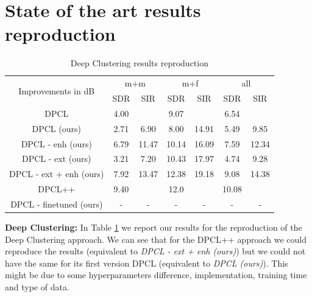 \documentclass[master, tikz, final,11pt, dvipdfmx]{iscs-thesis}
\begin{document}
\section{State of the art results reproduction}

\begin{table}[ht]
\centering
\begin{tabular}{c|c|c|c|c|c|c}
\multirow{2}{*}{Improvements in dB} & \multicolumn{2}{c|}{m+m} & \multicolumn{2}{c|}{m+f} & \multicolumn{2}{c}{all} \\ 
\cline{2-7} 
 & SDR & SIR & SDR & SIR & SDR & SIR \\ 
\hline 
DPCL \cite{DPCLV1} & 4.00 &  & 9.07 &  & 6.54 &  \\ 
DPCL (ours) & 2.71 & 6.90 & 8.00 & 14.91 & 5.49 & 9.85 
\\ 
\hline 
\hline 
DPCL - enh (ours) & 6.79 & 11.47 & 10.14 & 16.09 & 7.59 & 12.34 \\ 
DPCL - ext (ours) & 3.21 & 7.20 & 10.43 & 17.97 & 4.74 & 9.28 \\ 
DPCL - ext + enh (ours) & 7.92 & 13.47 & 12.38 & 19.18 & 9.08 & 14.38 \\ 
\hline 
\hline 
DPCL++ \cite{DPCLV2} & 9.40 &  & 12.0 &  & 10.08 &  \\ 
DPCL - finetuned (ours) & - & - & - & - & - & - \\ 
\end{tabular}
\captionsetup{justification=centering}
\caption{Deep Clustering results reproduction}
\label{table:DPCLreprod}
\end{table}

\textbf{Deep Clustering:} In Table \ref{table:DPCLreprod} we report our results for the reproduction of the Deep Clustering approach. We can see that for the DPCL++ \cite{DPCLV2} approach we could reproduce the results (equivalent to \textit{DPCL - ext + enh (ours)}) but we could not have the same for its first version DPCL \cite{DPCLV1} (equivalent to \textit{DPCL (ours)}). This might be due to some hyperparameters difference, implementation, training time and type of data.
\end{document}
